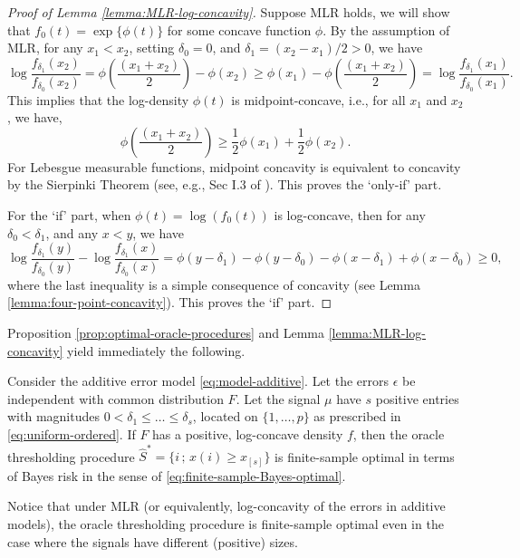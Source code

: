 \begin{proof}[Proof of Lemma \ref{lemma:MLR-log-concavity}]
Suppose MLR holds, we will show that $f_0(t) = \exp\{\phi(t)\}$ for some concave function $\phi$.
By the assumption of MLR, for any $x_1 < x_2$, setting $\delta_0 = 0$, and $\delta_1 = (x_2 - x_1)/2 > 0$, we have
\begin{equation*}
    \log{\frac{f_{\delta_1}(x_2)}{f_{\delta_0}(x_2)}}
    = \phi\left(\frac{(x_1+x_2)}{2}\right)- \phi(x_2) 
    \ge \phi(x_1)- \phi\left(\frac{(x_1+x_2)}{2}\right) 
    = \log{\frac{f_{\delta_1}(x_1)}{f_{\delta_0}(x_1)}}.
\end{equation*}
This implies that the log-density $\phi(t)$ is midpoint-concave, i.e., for all $x_1$ and $x_2$, we have,
\begin{equation}
    \phi\left(\frac{(x_1+x_2)}{2}\right) 
    \ge \frac{1}{2} \phi(x_1) + \frac{1}{2} \phi(x_2).
\end{equation}
For Lebesgue measurable functions, midpoint concavity is equivalent to concavity by the Sierpinki Theorem (see, e.g., Sec I.3 of \cite{donoghue2014distributions}). This proves the `only-if' part.

For the `if' part, when  $\phi(t) = \log{(f_0(t))}$ is log-concave, then for any $\delta_0 < \delta_1$, and any $x<y$, we have
\begin{equation} \label{eq:concavity-implies-MLR}
    \log{\frac{f_{\delta_1}(y)}{f_{\delta_0}(y)}} - \log{\frac{f_{\delta_1}(x)}{f_{\delta_0}(x)}}
    = \phi(y-\delta_1) - \phi(y-\delta_0) - \phi(x-\delta_1) + \phi(x-\delta_0) \ge 0,
\end{equation}
where the last inequality is a simple consequence of concavity (see Lemma \ref{lemma:four-point-concavity}). This proves the `if' part.
\end{proof}

Proposition \ref{prop:optimal-oracle-procedures} and Lemma \ref{lemma:MLR-log-concavity} yield immediately the following.

\begin{proposition} \label{prop:log-concave}
Consider the additive error model \eqref{eq:model-additive}.
Let the errors $\epsilon$ be independent with common distribution $F$.
Let the signal $\mu$ have $s$ positive entries with magnitudes $0<\delta_1\le\ldots\le\delta_s$, located on $\{1,\ldots,p\}$ as prescribed in \eqref{eq:uniform-ordered}.
If $F$ has a positive, log-concave density $f$, then the oracle thresholding procedure $\widehat{S}^* = \{i\,;\,x(i)\ge x_{[s]}\}$ is finite-sample optimal in terms of Bayes risk in the sense of \eqref{eq:finite-sample-Bayes-optimal}.
\end{proposition} 
Notice that under MLR (or equivalently, log-concavity of the errors in additive models), the oracle thresholding procedure is finite-sample optimal even in the case where the signals have different (positive) sizes.

